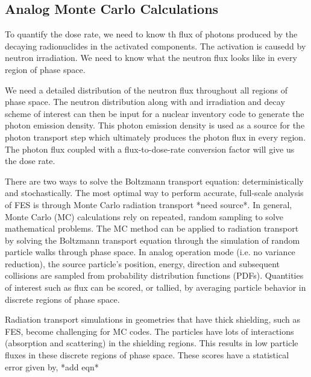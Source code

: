 
\subsection{Analog Monte Carlo Calculations}

To quantify the dose rate, we need to know th flux of photons
produced by the decaying radionuclides in the activated components. The
activation is causedd by neutron irradiation.
We need to know what the neutron flux looks like in every region of phase
space.

We need a detailed distribution of the neutron flux throughout all regions of phase
space.
The neutron distribution along with and irradiation and decay scheme of interest 
can then be input for a nuclear inventory code to generate the photon
emission density.  This photon emission density is used as a source for the
photon transport step which ultimately produces the photon flux in every region.
The photon flux coupled with a flux-to-dose-rate conversion factor will give us
the dose rate.


There are two ways to solve the Boltzmann transport equation: deterministically
and stochastically.
The most optimal way to perform accurate, full-scale analysis of FES is
through Monte Carlo radiation transport *need source*.
In general, Monte Carlo (MC) calculations rely on repeated, random sampling to solve
mathematical problems.  The MC method can be applied to radiation transport by
solving the Boltzmann transport equation through the simulation of random particle
walks through phase space.  In analog operation mode (i.e. no variance reduction), 
the source particle's position, energy, direction
and subsequent collisions are sampled from probability
distribution functions (PDFs).  Quantities of interest such as flux can be
scored, or tallied, by averaging particle behavior
in discrete regions of phase space.

Radiation transport simulations in geometries that have thick shielding, such as
FES, become challenging for MC codes.  The particles have lots of interactions
(absorption and scattering) in the shielding regions.  This results in low
particle fluxes in these discrete regions of phase space.  
These scores have a statistical error given by, *add eqn*

